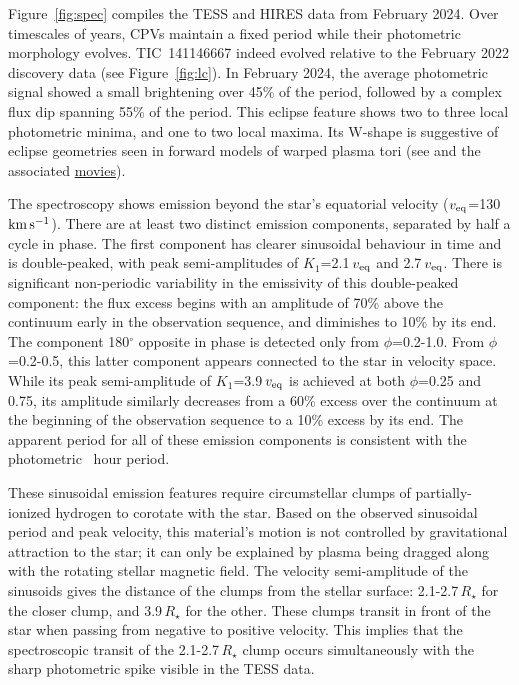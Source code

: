 \documentclass{nature3}
\newcommand{\kms}{\ensuremath{\rm km\,s^{-1}}}
\begin{document}
Figure~\ref{fig:spec} compiles the TESS and HIRES data from February
2024.  Over timescales of years, CPVs maintain a fixed period while
their photometric morphology evolves.  TIC~141146667 indeed evolved
relative to the February 2022 discovery data (see Figure~\ref{fig:lc}).
In February 2024, the average photometric signal showed a small
brightening over 45\% of the period, followed by a complex flux dip
spanning 55\% of the period.  This eclipse feature shows two to three
local photometric minima, and one to two local maxima.  Its W-shape is
suggestive of eclipse geometries seen in forward models of warped
plasma tori (see \cite{Townsend2008} and the associated
\href{http://user.astro.wisc.edu/~townsend/static.php?ref=rrm-movies#Download_Bundles}{movies}).

The spectroscopy shows emission beyond the star's equatorial velocity
($v_{\rm eq}$=130\,\kms).  There are at least two distinct emission
components, separated by half a cycle in phase.  The first component
has clearer sinusoidal behaviour in time and is double-peaked, with peak
semi-amplitudes of $K_1$=2.1\,$v_{\rm eq}$ and 2.7\,$v_{\rm eq}$.
There is significant non-periodic variability in the emissivity of
this double-peaked component: the flux excess begins with an amplitude
of 70\% above the continuum early in the observation sequence, and
diminishes to 10\% by its end.  The component 180$^\circ$ opposite in
phase is detected only from $\phi$=0.2-1.0.  From $\phi$=0.2-0.5, this
latter component appears connected to the star in velocity space.
While its peak semi-amplitude of $K_1$=3.9\,$v_{\rm eq}$ is achieved
at both $\phi$=0.25 and 0.75, its amplitude similarly decreases from a
60\% excess over the continuum at the beginning of the observation
sequence to a 10\% excess by its end.  The apparent period for all
of these emission components is consistent with the photometric
\periodhr\ hour period.  

These sinusoidal emission features require circumstellar clumps of
partially-ionized hydrogen to corotate with the star.  Based on the
observed sinusoidal period and peak velocity, this material's motion
is not controlled by gravitational attraction to the star; it can only be
explained by plasma being dragged along with the rotating stellar
magnetic field.  The velocity semi-amplitude of the sinusoids gives
the distance of the clumps from the stellar surface:
2.1-2.7\,$R_\star$ for the closer clump, and 3.9\,$R_\star$ for the
other.   These clumps transit in front of the star when passing from
negative to positive velocity.  This implies that the spectroscopic
transit of the 2.1-2.7\,$R_\star$ clump occurs simultaneously with the
sharp photometric spike visible in the TESS data.
\end{document}
